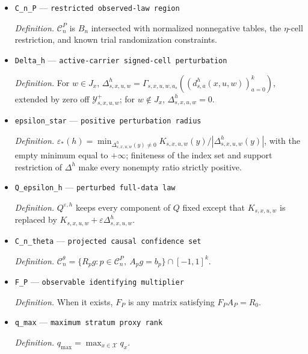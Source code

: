 \documentclass{article}
\begin{document}
\begin{itemize}
  \par\smallskip\noindent\emph{Definition.} \(d^h_{s,a}(x,u,w)=\rho_x(w)\{r^h_a(x,u)-r^h_{a_s}(x,u)\}/C_x(w\mid u)\) for \(w\in J_x\), and \(d^h_{s,a}(x,u,w)=0\) for \(w\notin J_x\).
  \item \texttt{C\_\allowbreak{}n\_\allowbreak{}P} --- \texttt{restricted observed-\allowbreak{}law region}
  \par\smallskip\noindent\emph{Definition.} \(\mathcal C_n^P\) is \(B_n\) intersected with normalized nonnegative tables, the \(\eta\)-cell restriction, and known trial randomization constraints.
  \item \texttt{Delta\_\allowbreak{}h} --- \texttt{active-\allowbreak{}carrier signed-\allowbreak{}cell perturbation}
  \par\smallskip\noindent\emph{Definition.} For \(w\in J_x\), \(\Delta^h_{s,x,u,w}=\Gamma_{s,x,u,w,a_s}((d^h_{s,a}(x,u,w))_{a=0}^{k})\), extended by zero off \(\mathcal Y^+_{s,x,u,w}\); for \(w\notin J_x\), \(\Delta^h_{s,x,u,w}=0\).
  \item \texttt{epsilon\_\allowbreak{}star} --- \texttt{positive perturbation radius}
  \par\smallskip\noindent\emph{Definition.} \(\varepsilon_*(h)=\min_{\Delta^h_{s,x,u,w}(y)\ne0}K_{s,x,u,w}(y)/|\Delta^h_{s,x,u,w}(y)|\), with the empty minimum equal to \(+\infty\); finiteness of the index set and support restriction of \(\Delta^h\) make every nonempty ratio strictly positive.
  \item \texttt{Q\_\allowbreak{}epsilon\_\allowbreak{}h} --- \texttt{perturbed full-\allowbreak{}data law}
  \par\smallskip\noindent\emph{Definition.} \(Q^{\varepsilon,h}\) keeps every component of \(Q\) fixed except that \(K_{s,x,u,w}\) is replaced by \(K_{s,x,u,w}+\varepsilon\Delta^h_{s,x,u,w}\).
  \item \texttt{C\_\allowbreak{}n\_\allowbreak{}theta} --- \texttt{projected causal confidence set}
  \par\smallskip\noindent\emph{Definition.} \(\mathcal C_n^\theta=\{R_p g:p\in\mathcal C_n^P,\ A_p g=b_p\}\cap[-1,1]^k\).
  \item \texttt{F\_\allowbreak{}P} --- \texttt{observable identifying multiplier}
  \par\smallskip\noindent\emph{Definition.} When it exists, \(F_P\) is any matrix satisfying \(F_PA_P=R_0\).
  \item \texttt{q\_\allowbreak{}max} --- \texttt{maximum stratum proxy rank}
  \par\smallskip\noindent\emph{Definition.} \(q_{\max}=\max_{x\in\mathcal X}q_x\).

\end{itemize}
\end{document}
